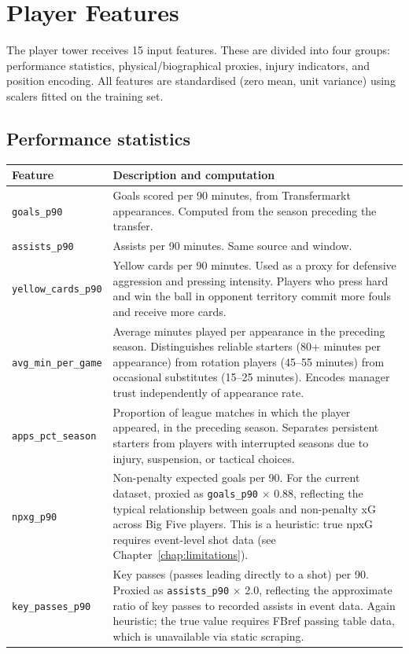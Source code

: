 \documentclass[12pt, a4paper, oneside]{report}
\begin{document}
\section{Player Features}
\label{sec:player_features}

The player tower receives 15 input features. These are divided into four groups: performance statistics, physical/biographical proxies, injury indicators, and position encoding. All features are standardised (zero mean, unit variance) using scalers fitted on the training set.

\subsection{Performance statistics}

\begin{longtable}{p{3.5cm} p{9.5cm}}
\toprule
\textbf{Feature} & \textbf{Description and computation} \\
\midrule
\texttt{goals\_p90} & Goals scored per 90 minutes, from Transfermarkt appearances. Computed from the season preceding the transfer. \\[4pt]
\texttt{assists\_p90} & Assists per 90 minutes. Same source and window. \\[4pt]
\texttt{yellow\_cards\_p90} & Yellow cards per 90 minutes. Used as a proxy for defensive aggression and pressing intensity. Players who press hard and win the ball in opponent territory commit more fouls and receive more cards. \\[4pt]
\texttt{avg\_min\_per\_game} & Average minutes played per appearance in the preceding season. Distinguishes reliable starters (80+ minutes per appearance) from rotation players (45--55 minutes) from occasional substitutes (15--25 minutes). Encodes manager trust independently of appearance rate. \\[4pt]
\texttt{apps\_pct\_season} & Proportion of league matches in which the player appeared, in the preceding season. Separates persistent starters from players with interrupted seasons due to injury, suspension, or tactical choices. \\[4pt]
\texttt{npxg\_p90} & Non-penalty expected goals per 90. For the current dataset, proxied as \texttt{goals\_p90} $\times$ 0.88, reflecting the typical relationship between goals and non-penalty xG across Big Five players. This is a heuristic: true npxG requires event-level shot data (see Chapter~\ref{chap:limitations}). \\[4pt]
\texttt{key\_passes\_p90} & Key passes (passes leading directly to a shot) per 90. Proxied as \texttt{assists\_p90} $\times$ 2.0, reflecting the approximate ratio of key passes to recorded assists in event data. Again heuristic; the true value requires FBref passing table data, which is unavailable via static scraping. \\[4pt]

\end{longtable}
\end{document}
